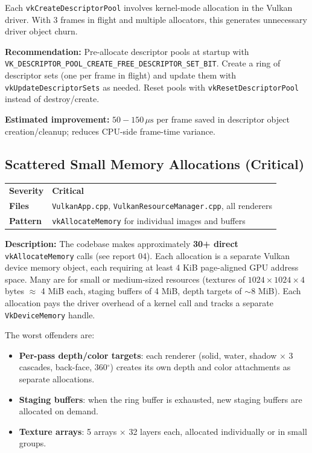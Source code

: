 \documentclass[a4paper,10pt]{article}
\newcommand{\us}{\ensuremath{\,\mu\text{s}}}
\newcommand{\degree}{\ensuremath{^\circ}}
\newcommand{\severity}[1]{%
  \ifstrequal{#1}{Critical}{\textcolor{critical}{\textbf{#1}}}{%
  \ifstrequal{#1}{High}{\textcolor{high}{\textbf{#1}}}{%
  \ifstrequal{#1}{Medium}{\textcolor{medium}{\textbf{#1}}}{%
  \ifstrequal{#1}{Low}{\textcolor{low}{\textbf{#1}}}{#1}}}}}
\begin{document}
Each \texttt{vkCreateDescriptorPool} involves kernel-mode allocation in the
Vulkan driver. With 3 frames in flight and multiple allocators, this generates
unnecessary driver object churn.

\noindent\textbf{Recommendation:} Pre-allocate descriptor pools at startup with
\texttt{VK\_DESCRIPTOR\_POOL\_CREATE\_FREE\_DESCRIPTOR\_SET\_BIT}. Create a
ring of descriptor sets (one per frame in flight) and update them with
\texttt{vkUpdateDescriptorSets} as needed. Reset pools with
\texttt{vkResetDescriptorPool} instead of destroy/create.

\noindent\textbf{Estimated improvement:} $50{-}150\us$ per frame saved in
descriptor object creation/cleanup; reduces CPU-side frame-time variance.

\subsection{Scattered Small Memory Allocations (Critical)}

\begin{tabular}{ll}
\textbf{Severity} & \severity{Critical} \\
\textbf{Files}     & \texttt{VulkanApp.cpp}, \texttt{VulkanResourceManager.cpp},
                      all renderers \\
\textbf{Pattern}   & \texttt{vkAllocateMemory} for individual images and buffers \\
\end{tabular}

\vspace{0.5em}
\noindent
\textbf{Description:} The codebase makes approximately \textbf{30+ direct}
\texttt{vkAllocateMemory} calls (see report 04). Each allocation is a separate
Vulkan device memory object, each requiring at least 4 KiB
page-aligned GPU address space. Many are for small or medium-sized resources
(textures of $1024 \times 1024 \times 4$ bytes $\approx$ 4 MiB each, staging
buffers of 4 MiB, depth targets of $\sim$8 MiB). Each allocation pays the
driver overhead of a kernel call and tracks a separate \texttt{VkDeviceMemory}
handle.

The worst offenders are:
\begin{itemize}[nosep]
    \item \textbf{Per-pass depth/color targets}: each renderer (solid, water,
          shadow $\times$ 3 cascades, back-face, 360\degree) creates its own
          depth and color attachments as separate allocations.
    \item \textbf{Staging buffers}: when the ring buffer is exhausted, new
          staging buffers are allocated on demand.
    \item \textbf{Texture arrays}: 5 arrays $\times$ 32 layers each, allocated
          individually or in small groups.
\end{itemize}
\end{document}
